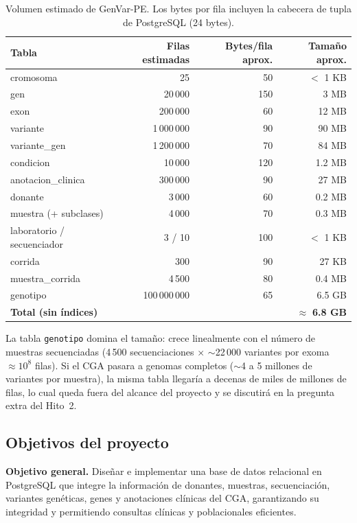 \documentclass[11pt,a4paper]{article}
\newcommand{\tb}[1]{\texttt{#1}}
\begin{document}
\begin{table}[H]
\centering
\small
\begin{tabular}{lrrr}
\toprule
\textbf{Tabla} & \textbf{Filas estimadas} & \textbf{Bytes/fila aprox.} & \textbf{Tamaño aprox.} \\
\midrule
cromosoma & 25 & 50 & $<$ 1 KB \\
gen & 20\,000 & 150 & 3 MB \\
exon & 200\,000 & 60 & 12 MB \\
variante & 1\,000\,000 & 90 & 90 MB \\
variante\_gen & 1\,200\,000 & 70 & 84 MB \\
condicion & 10\,000 & 120 & 1.2 MB \\
anotacion\_clinica & 300\,000 & 90 & 27 MB \\
donante & 3\,000 & 60 & 0.2 MB \\
muestra (+ subclases) & 4\,000 & 70 & 0.3 MB \\
laboratorio / secuenciador & 3 / 10 & 100 & $<$ 1 KB \\
corrida & 300 & 90 & 27 KB \\
muestra\_corrida & 4\,500 & 80 & 0.4 MB \\
genotipo & 100\,000\,000 & 65 & 6.5 GB \\
\midrule
\textbf{Total (sin índices)} & & & $\approx$ \textbf{6.8 GB} \\
\bottomrule
\end{tabular}
\caption{Volumen estimado de GenVar-PE. Los bytes por fila incluyen la cabecera de tupla de PostgreSQL (24 bytes).}
\label{tab:volumen}
\end{table}

La tabla \tb{genotipo} domina el tamaño: crece linealmente con el número de muestras secuenciadas (4\,500 secuenciaciones $\times$ $\sim$22\,000 variantes por exoma $\approx 10^8$ filas). Si el CGA pasara a genomas completos ($\sim$4 a 5 millones de variantes por muestra), la misma tabla llegaría a decenas de miles de millones de filas, lo cual queda fuera del alcance del proyecto y se discutirá en la pregunta extra del Hito~2.

\subsection{Objetivos del proyecto}

\textbf{Objetivo general.} Diseñar e implementar una base de datos relacional en PostgreSQL que integre la información de donantes, muestras, secuenciación, variantes genéticas, genes y anotaciones clínicas del CGA, garantizando su integridad y permitiendo consultas clínicas y poblacionales eficientes.
\end{document}
